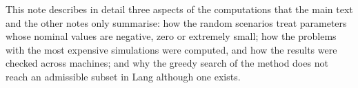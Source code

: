 

This note describes in detail three aspects of the computations that the main text and the other notes only summarise: how the random scenarios treat parameters whose nominal values are negative, zero or extremely small; how the problems with the most expensive simulations were computed, and how the results were checked across machines; and why the greedy search of the method does not reach an admissible subset in Lang although one exists.

